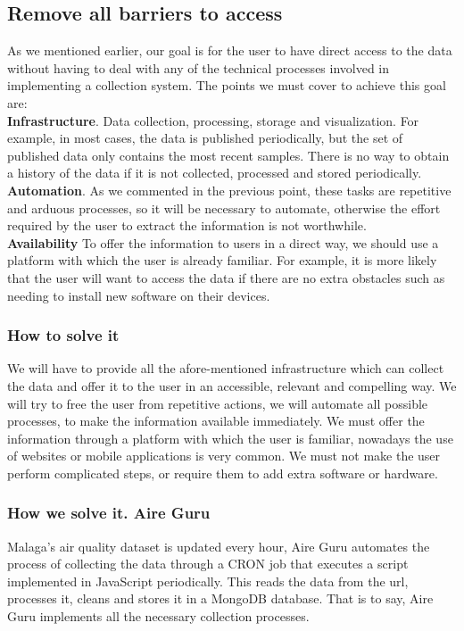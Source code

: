 \subsection{Remove all barriers to access}
As we mentioned earlier, our goal is for the user to have direct access to the data without having to deal with any
of the technical processes involved in implementing a collection system. The points we must cover to achieve this goal are: \\

\textbf{Infrastructure}. Data collection, processing, storage and visualization. For example, in most cases, the data is
published periodically, but the set of published data only contains the most recent samples. There is no way to obtain
a history of the data if it is not collected, processed and stored periodically. \\

\textbf{Automation}. As we commented in the previous point, these tasks are repetitive and arduous processes, so it will be
necessary to automate, otherwise the effort required by the user to extract the information is not worthwhile. \\

\textbf{Availability} To offer the information to users in a direct way, we should use a platform with which the user is already 
familiar. For example, it is more likely that the user will want to access the data if there are no extra obstacles such as needing 
to install new software on their devices. \\

\subsubsection*{How to solve it} 
We will have to provide all the afore-mentioned infrastructure which can collect the data and offer it to the user in an accessible, relevant and compelling way.
We will try to free the user from repetitive actions, we will automate all possible processes, to make the information available immediately.
We must offer the information through a platform with which the user is familiar, nowadays the use of websites or mobile applications is very common.
We must not make the user perform complicated steps, or require them to add extra software or hardware.

\subsubsection*{How we solve it. Aire Guru} 
Malaga's air quality dataset is updated every hour, Aire Guru automates the process of collecting the
data through a CRON job that executes a script implemented in JavaScript periodically. This reads the data from the url, processes it,
cleans and stores it in a MongoDB database. That is to say, Aire Guru implements all the necessary collection processes.

